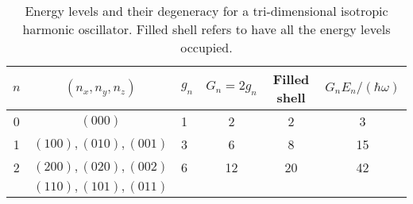 \begin{table}%
\begin{center} 
\begin{tabular}{cclccc}
\toprule[1pt]
$n$\!  &\! $(n_x,n_y,n_z)$ \! &\! $g_n$\!  &\! $G_n\! = \!2g_n$  &\! Filled shell \!& $G_n E_n/(\hbar \omega)$\\
\midrule[1pt]	
0				   & \!$(000)$ \!		    &   1    & 2                 &  	 2 & 3\\
1				   &\! $(100), (010), (001)$ \! &   3    & 6                 &  	 8 & 15\\
2                       	   &\! $(200), (020), (002)$ \! &   6    & 12                &  	 20 & 42\\ 
				   &\! $(110), (101), (011)$ \! &        &                   &          & \\
\bottomrule[1pt]
\end{tabular} 
\end{center}
\caption{Energy levels and their degeneracy for a tri-dimensional isotropic harmonic oscillator. Filled shell refers to have all the energy levels occupied.}
\label{3DHOEnergyLevels}
\end{table}

